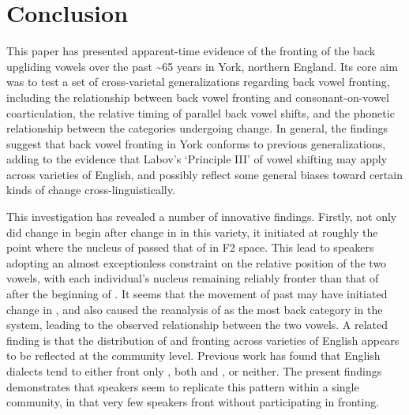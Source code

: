 \documentclass[12pt]{article}
\begin{document}
\section{Conclusion}

This paper has presented apparent-time evidence of the fronting of the back upgliding vowels over the past \textasciitilde65 years in York, northern England. Its core aim was to test a set of cross-varietal generalizations regarding back vowel fronting, including the relationship between back vowel fronting and consonant-on-vowel coarticulation, the relative timing of parallel back vowel shifts, and the phonetic relationship between the categories undergoing change. In general, the findings suggest that back vowel fronting in York conforms to previous generalizations, adding to the evidence that Labov's `Principle III' of vowel shifting may apply across varieties of English, and possibly reflect some general biases toward certain kinds of change cross-linguistically. 

This investigation has revealed a number of innovative findings. Firstly, not only did change in  begin after change in  in this variety, it initiated at roughly the point where the nucleus of  passed that of  in F2 space. This lead to speakers adopting an almost exceptionless constraint on the relative position of the two vowels, with each individual's  nucleus remaining reliably fronter than that of  after the beginning of . It seems that the movement of  past  may have initiated change in , and also caused the reanalysis of  as the most back category in the system, leading to the observed relationship between the two vowels. A related finding is that the distribution of  and  fronting across varieties of English appears to be reflected at the community level. Previous work has found that English dialects tend to either front only , both  and , or neither. The present findings demonstrates that speakers seem to replicate this pattern within a single community, in that very few speakers front  without participating in  fronting.
\end{document}
